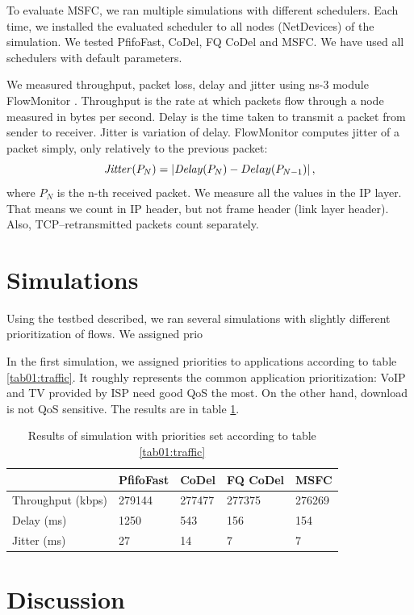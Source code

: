 To evaluate MSFC, we ran multiple simulations with different schedulers. Each time, we installed the evaluated scheduler to all nodes (NetDevices) of the simulation. We tested PfifoFast, CoDel, FQ CoDel and MSFC. We have used all schedulers with default parameters. 

We measured throughput, packet loss, delay and jitter using ns-3 module FlowMonitor \cite{flowMonitor}. Throughput is the rate at which packets flow through a node measured in bytes per second. Delay is the time taken to transmit a packet from sender to receiver. Jitter is variation of delay. FlowMonitor computes jitter of a packet simply, only relatively to the previous packet:
\[
	\text{\emph{Jitter}}(P_N) = \left|{\text{\emph{Delay}}(P_N) - Delay(P_{N-1})}\right|,
\]
where $P_N$ is the n-th received packet. We measure all the values in the IP layer. That means we count in IP header, but not frame header (link layer header). Also, TCP--retransmitted packets count separately.

\section{Simulations}

Using the testbed described, we ran several simulations with slightly different prioritization of flows. We assigned prio

In the first simulation, we assigned priorities to applications according to table \ref{tab01:traffic}. It roughly represents the common application prioritization: VoIP and TV provided by ISP need good QoS the most. On the other hand, download is not QoS sensitive. The results are in table \ref{tab02:results}.




\begin{table}[]
	\centering
	\caption{Results of simulation with priorities set according to table \ref{tab01:traffic}}
	\label{tab02:results}
	\begin{tabular}{lllll}
		\hline
								& PfifoFast & CoDel  & FQ CoDel & MSFC   \\ \hline
		Throughput (kbps)       & 279144    & 277477 & 277375   & 276269 \\
		Delay (ms)              & 1250      & 543    & 156      & 154    \\
		Jitter (ms)             & 27        & 14     & 7        & 7      \\
	\end{tabular}
\end{table}







\section{Discussion}